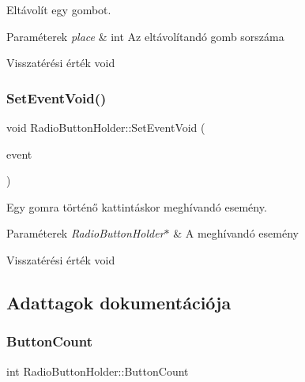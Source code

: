 Eltávolít egy gombot. 


\begin{DoxyParams}{Paraméterek}
{\em place} & int Az eltávolítandó gomb sorszáma \\
\hline
\end{DoxyParams}
\begin{DoxyReturn}{Visszatérési érték}
void 
\end{DoxyReturn}
\mbox{\label{class_radio_button_holder_a1b15e73021c8e2022d43b12f4246182d}} 
\subsubsection{\texorpdfstring{Set\+Event\+Void()}{SetEventVoid()}}
{\footnotesize\ttfamily void Radio\+Button\+Holder\+::\+Set\+Event\+Void (\begin{DoxyParamCaption}\item[{std\+::function$<$ void(\hyperlink{class_radio_button_holder}{Radio\+Button\+Holder} $\ast$)$>$}]{event }\end{DoxyParamCaption})}



Egy gomra történő kattintáskor meghívandó esemény. 


\begin{DoxyParams}{Paraméterek}
{\em Radio\+Button\+Holder$\ast$} & A meghívandó esemény \\
\hline
\end{DoxyParams}
\begin{DoxyReturn}{Visszatérési érték}
void 
\end{DoxyReturn}


\subsection{Adattagok dokumentációja}
\mbox{\label{class_radio_button_holder_a115a7d96d3c3a7a97d3e9bc4d04b50e0}} 
\subsubsection{\texorpdfstring{Button\+Count}{ButtonCount}}
{\footnotesize\ttfamily int Radio\+Button\+Holder\+::\+Button\+Count\hspace{0.3cm}{\ttfamily [private]}}


